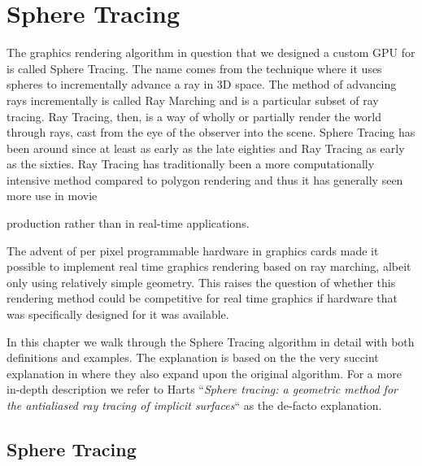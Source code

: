 \chapter{Sphere Tracing}


	The graphics rendering algorithm in question that we designed a custom GPU
	for is called Sphere Tracing\cite{Hart1996}. The name comes from the
	technique where it uses spheres to incrementally advance a ray in 3D space.
	The method of advancing rays incrementally is called Ray Marching and is a
	particular subset of ray tracing\cite{Whitted1980}. Ray Tracing, then, is a
	way of wholly or partially render the world through rays, cast from the eye
	of the observer into the scene. Sphere Tracing has been around since at least as early as the late eighties\cite{Hart1989} and Ray Tracing as early as the
	sixties\cite{Appel1968}. Ray Tracing has traditionally been a more
	computationally intensive method compared to polygon
	rendering\cite{Wylie1967} and thus it has generally seen more use in movie

	production rather than in real-time applications.\cite{ref_needed?} 

	The advent of per pixel programmable hardware in graphics cards made it 
	possible to implement real time graphics rendering based on ray	marching, 
	albeit only using relatively simple geometry. This raises the question of 
	whether this rendering method could be competitive for real time graphics 
	if hardware that was specifically designed for it was available.

	In this chapter we walk through the Sphere Tracing algorithm in detail with
	both definitions and examples. The explanation is based on the the very
	succint explanation in \cite{Korndorfer2014} where they also expand upon the
	original algorithm. For a more in-depth description we refer to Harts
	``\emph{Sphere tracing: a geometric method for the antialiased ray tracing
	of implicit surfaces}``\cite{Hart1996} as the de-facto explanation.


	\section{Sphere Tracing} 


